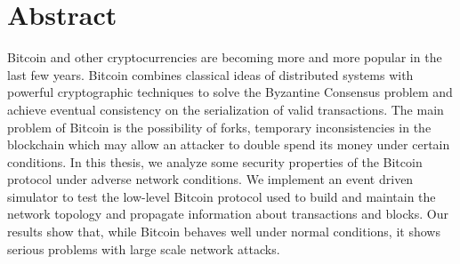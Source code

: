 \chapter*{Abstract}
Bitcoin and other cryptocurrencies are becoming more and more popular in the last few years.
Bitcoin combines classical ideas of distributed systems with powerful cryptographic techniques to solve the Byzantine Consensus problem and achieve eventual consistency on the serialization of valid transactions.
The main problem of Bitcoin is the possibility of forks, temporary inconsistencies in the blockchain which may allow an attacker to double spend its money under certain conditions.
In this thesis, we analyze some security properties of the Bitcoin protocol under adverse network conditions.
We implement an event driven simulator to test the low-level Bitcoin protocol used to build and maintain the network topology and propagate information about transactions and blocks.
Our results show that, while Bitcoin behaves well under normal conditions, it shows serious problems with large scale network attacks.
